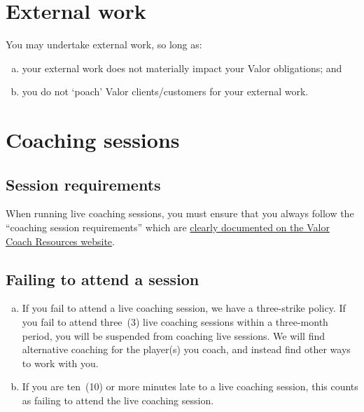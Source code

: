 \documentclass[10pt]{article}
\begin{document}
\section{External work}
You may undertake external work, so long as:
\begin{enumerate}[(a)]
	\item your external work does not materially impact your Valor obligations; and
	\item you do not `poach' Valor clients/customers for your external work.
\end{enumerate}


\section{Coaching sessions}
\subsection{Session requirements}
When running live coaching sessions, you must ensure that you always follow the ``coaching session requirements'' which are \href{https://valoresports.github.io/coach-resources/docs/live-coaching/live-coaching-session-requirements}{clearly documented on the Valor Coach Resources website}.

\subsection{Failing to attend a session}
\begin{enumerate}[(a)]
	\item If you fail to attend a live coaching session, we have a three-strike policy. If you fail to attend three~(3) live coaching sessions within a three-month period, you will be suspended from coaching live sessions. We will find alternative coaching for the player(s) you coach, and instead find other ways to work with you.

	\item If you are ten~(10) or more minutes late to a live coaching session, this counts as failing to attend the live coaching session.
\end{enumerate}
\end{document}
